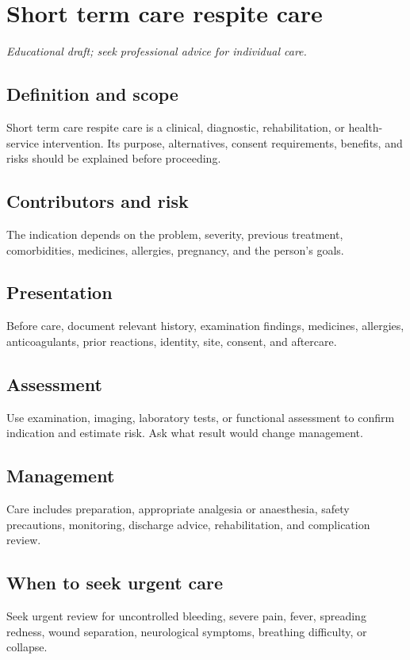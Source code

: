 \chapter{Short term care respite care}
\medskip
\noindent\textit{Educational draft; seek professional advice for individual care.}

\section*{Definition and scope}
Short term care respite care is a clinical, diagnostic, rehabilitation, or health-service intervention. Its purpose, alternatives, consent requirements, benefits, and risks should be explained before proceeding.

\section*{Contributors and risk}
The indication depends on the problem, severity, previous treatment, comorbidities, medicines, allergies, pregnancy, and the person’s goals.

\section*{Presentation}
Before care, document relevant history, examination findings, medicines, allergies, anticoagulants, prior reactions, identity, site, consent, and aftercare.

\section*{Assessment}
Use examination, imaging, laboratory tests, or functional assessment to confirm indication and estimate risk. Ask what result would change management.

\section*{Management}
Care includes preparation, appropriate analgesia or anaesthesia, safety precautions, monitoring, discharge advice, rehabilitation, and complication review.

\section*{When to seek urgent care}
Seek urgent review for uncontrolled bleeding, severe pain, fever, spreading redness, wound separation, neurological symptoms, breathing difficulty, or collapse.

